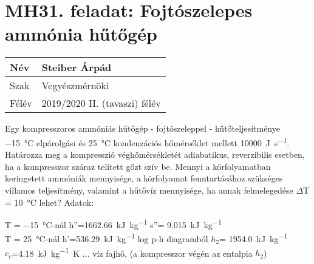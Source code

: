 

\section*{MH31. feladat: Fojtószelepes ammónia hűtőgép}

\begin{tabular}{ | p{2cm} | p{14cm} | } 
	\hline
	Név & Steiber Árpád \\ 
	\hline
	Szak & Vegyészmérnöki \\ 
	\hline
	Félév & 2019/2020 II. (tavaszi) félév \\ 
	\hline
\end{tabular}
\vspace{0.5cm}

\noindent Egy kompresszoros ammóniás hűtőgép - fojtószeleppel - hűtőteljesítménye \SI{-15}{\celsius} elpárolgási és \SI{25}{\celsius} kondenzációs hőmérséklet mellett  \SI{10000}{\joule\per\second}. Határozza meg a kompresszió véghőmérsékletét adiabatikus, reverzibilis esetben, ha a kompresszor száraz telített gőzt szív be. Mennyi a körfolyamatban keringetett ammóniák mennyisége, a körfolyamat fenntartásához szükséges villamos teljesítmény, valamint a hűtővíz mennyisége, ha annak felmelegedése $\Delta$T = \SI{10}{\celsius} lehet?
\vspace{0.5cm}
Adatok:
\begin{center}
	T = \SI{-15}{\celsius}-nál \hspace{1cm} h''=\SI{1662.66}{\kilo\joule\per\kilo\gram}  \hspace{4.2cm} s''= \SI{9.015}{\kilo\joule\per\kilo\gram} \\
\hspace{0.1cm}	T = \SI{25}{\celsius}-nál \hspace{1.5cm} h'=\SI{536,29}{\kilo\joule\per\kilo\gram} \hspace{1cm} log p-h diagramból $h_2$= \SI{1954.0}{\kilo\joule\per\kilo\gram} \\
		$c_v$=\SI{4.18}{\kilo\joule\per\kilo\gram\kelvin} ...  víz fajhő, (a kompresszor végén az entalpia $h_2$) \hspace{2.2cm}
		
\end{center}

\vspace{2mm}

